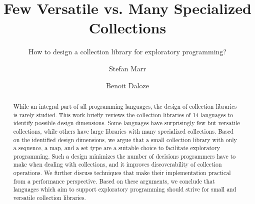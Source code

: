 \documentclass[sigconf, authorversion]{acmart}
\def\Title{Few Versatile vs. Many Specialized Collections}
\def\SubTitle{How to design a collection library for exploratory programming?}
\def\LangCnt{14\xspace}
\begin{document}
\title{\Title}
\subtitle{\SubTitle}

\author{Stefan Marr}

\author{Benoit Daloze}




\begin{abstract}
While an integral part of all programming languages,
the design of collection libraries is rarely studied.
This work briefly reviews the collection libraries of \LangCnt languages
to identify possible design dimensions.
Some languages have surprisingly few but versatile collections,
while others have large libraries with many specialized collections.
Based on the identified design dimensions,
we argue that a small collection library
with only a sequence, a map, and a set type
are a suitable choice to facilitate exploratory programming.
Such a design minimizes the number of decisions programmers
have to make when dealing with collections,
and it improves discoverability of collection operations.
We further discuss
techniques
that make their implementation practical from a performance perspective.
Based on these arguments,
we conclude that languages which aim to support exploratory programming
should strive for small and versatile collection libraries.
\end{abstract}
\end{document}
